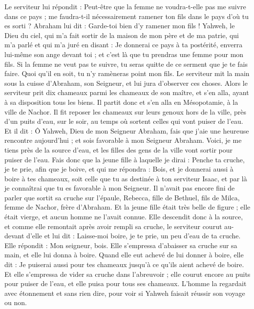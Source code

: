 \begin{multicols}{2}
Le serviteur lui répondit : Peut-être que la femme ne voudra-t-elle pas me suivre dans ce pays ; me faudra-t-il nécessairement ramener ton fils dans le pays d'où tu es sorti ?
Abraham lui dit : Garde-toi bien d'y ramener mon fils !
Yahweh, le Dieu du ciel, qui m'a fait sortir de la maison de mon père et de ma patrie, qui m'a parlé et qui m’a juré en disant : Je donnerai ce pays à ta postérité, enverra lui-même son ange devant toi ; et c’est là que tu prendras une femme pour mon fils.
Si la femme ne veut pas te suivre, tu seras quitte de ce serment que je te fais faire. Quoi qu'il en soit, tu n’y ramèneras point mon fils.
Le serviteur mit la main sous la cuisse d'Abraham, son Seigneur, et lui jura d’observer ces choses.
Alors le serviteur prit dix chameaux parmi les chameaux de son maître, et s'en alla, ayant à sa disposition tous les biens. Il partit donc et s'en alla en Mésopotamie, à la ville de Nachor.
Il fit reposer les chameaux sur leurs genoux hors de la ville, près d'un puits d'eau, sur le soir, au temps où sortent celles qui vont puiser de l'eau.
Et il dit : Ô Yahweh, Dieu de mon Seigneur Abraham, fais que j'aie une heureuse rencontre aujourd'hui ; et sois favorable à mon Seigneur Abraham.
Voici, je me tiens près de la source d'eau, et les filles des gens de la ville vont sortir pour puiser de l'eau.
Fais donc que la jeune fille à laquelle je dirai : Penche ta cruche, je te prie, afin que je boive, et qui me répondra : Bois, et je donnerai aussi à boire à tes chameaux, soit celle que tu as destinée à ton serviteur Isaac, et par là je connaîtrai que tu es favorable à mon Seigneur.
Il n’avait pas encore fini de parler que sortit sa cruche sur l’épaule, Rebecca, fille de Bethuel, fils de Milca, femme de Nachor, frère d'Abraham.
Et la jeune fille était très belle de figure ; elle était vierge, et aucun homme ne l'avait connue. Elle descendit donc à la source, et comme elle remontait après avoir rempli sa cruche,
le serviteur courut au-devant d'elle et lui dit : Laisse-moi boire, je te prie, un peu d’eau de ta cruche.
Elle répondit : Mon seigneur, bois. Elle s’empressa d’abaisser sa cruche sur sa main,  et elle lui donna à boire.
Quand elle eut achevé de lui donner à boire, elle dit : Je puiserai aussi pour tes chameaux jusqu'à ce qu'ils aient achevé de boire.
Et elle s’empressa de vider sa cruche dans l’abreuvoir ; elle courut encore au puits pour puiser de l'eau, et elle puisa pour tous ses chameaux.
L’homme la regardait avec étonnement et sans rien dire, pour voir si Yahweh faisait réussir son voyage ou non.

\end{multicols}
